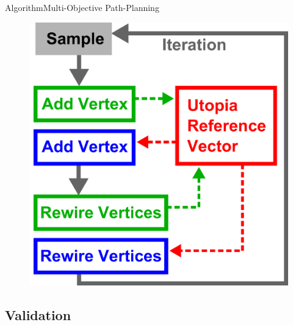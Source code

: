 \begin{frame}{Algorithm}{Multi-Objective Path-Planning}

	\begin{figure}[t]
		\centering
		\includegraphics[width=.5\linewidth]{figure/MORRF_alg}
	\end{figure}

\end{frame}

\subsection{Validation}

